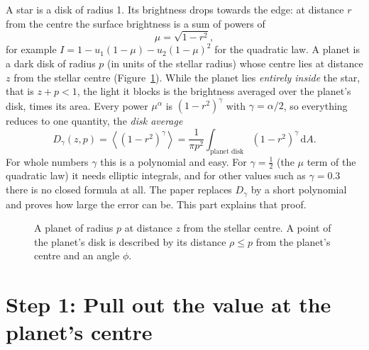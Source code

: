 \documentclass[11pt,a4paper]{article}
\theoremstyle{remark}
\newcommand{\avg}[1]{\left\langle #1 \right\rangle}
\newcommand{\dd}{\mathrm{d}}
\begin{document}
A star is a disk of radius 1. Its brightness drops towards the edge: at distance $r$ from the
centre the surface brightness is a sum of powers of
\[
  \mu=\sqrt{1-r^2},
\]
for example $I=1-u_1(1-\mu)-u_2(1-\mu)^2$ for the quadratic law. A planet is a dark disk of
radius $p$ (in units of the stellar radius) whose centre lies at distance $z$ from the stellar
centre (Figure~\ref{fig:geom}). While the planet lies \emph{entirely inside} the star, that is
$z+p<1$, the light it blocks is the brightness averaged over the planet's disk, times its area.
Every power $\mu^{\alpha}$ is $(1-r^2)^\gamma$ with $\gamma=\alpha/2$, so everything reduces to
one quantity, the \emph{disk average}
\begin{equation}
  D_\gamma(z,p)=\avg{(1-r^2)^\gamma}
  =\frac{1}{\pi p^2}\int_{\text{planet disk}}(1-r^2)^\gamma\,\dd A .
  \label{eq:D}
\end{equation}
For whole numbers $\gamma$ this is a polynomial and easy. For $\gamma=\tfrac12$ (the $\mu$ term
of the quadratic law) it needs elliptic integrals, and for other values such as $\gamma=0.3$ there
is no closed formula at all. The paper replaces $D_\gamma$ by a short polynomial and proves how
large the error can be. This part explains that proof.

\begin{figure}[h]
\centering
{}
\caption{A planet of radius $p$ at distance $z$ from the stellar centre. A point of the planet's
disk is described by its distance $\rho\le p$ from the planet's centre and an angle $\phi$.}
\label{fig:geom}
\end{figure}

\section{Step 1: Pull out the value at the planet's centre}
\end{document}
